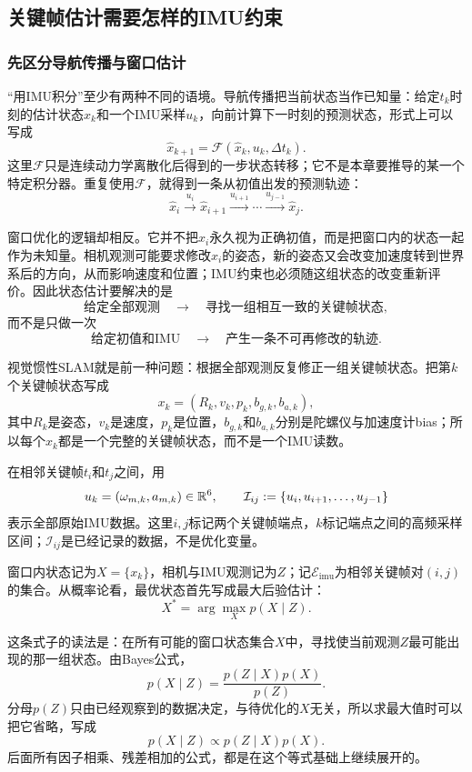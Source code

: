 \subsection{关键帧估计需要怎样的IMU约束}

\subsubsection{先区分导航传播与窗口估计}

“用IMU积分”至少有两种不同的语境。导航传播把当前状态当作已知量：给定$t_k$时刻的估计状态$\widehat{x}_k$和一个IMU采样$u_k$，向前计算下一时刻的预测状态，形式上可以写成
\[
    \widehat{x}_{k+1}
    =\mathcal F(\widehat{x}_k,u_k,\Delta t_k).
\]
这里$\mathcal F$只是连续动力学离散化后得到的一步状态转移；它不是本章要推导的某一个特定积分器。重复使用$\mathcal F$，就得到一条从初值出发的预测轨迹：
\[
    \widehat{x}_i
    \xrightarrow{u_i}
    \widehat{x}_{i+1}
    \xrightarrow{u_{i+1}}
    \cdots
    \xrightarrow{u_{j-1}}
    \widehat{x}_j.
\]

窗口优化的逻辑却相反。它并不把$\widehat{x}_i$永久视为正确初值，而是把窗口内的状态一起作为未知量。相机观测可能要求修改$x_i$的姿态，新的姿态又会改变加速度转到世界系后的方向，从而影响速度和位置；IMU约束也必须随这组状态的改变重新评价。因此状态估计要解决的是
\[
    \text{给定全部观测}
    \quad\longrightarrow\quad
    \text{寻找一组相互一致的关键帧状态},
\]
而不是只做一次
\[
    \text{给定初值和IMU}
    \quad\longrightarrow\quad
    \text{产生一条不可再修改的轨迹}.
\]

视觉惯性SLAM就是前一种问题：根据全部观测反复修正一组关键帧状态。把第$k$个关键帧状态写成
\[
    x_k=(R_k,v_k,p_k,b_{g,k},b_{a,k}),
\]
其中$R_k$是姿态，$v_k$是速度，$p_k$是位置，$b_{g,k}$和$b_{a,k}$分别是陀螺仪与加速度计bias；所以每个$x_k$都是一个完整的关键帧状态，而不是一个IMU读数。

在相邻关键帧$t_i$和$t_j$之间，用
\[
    u_k=(\omega_{m,k},a_{m,k})\in\mathbb{R}^6,
    \qquad
    \mathcal I_{ij}:=\{u_i,u_{i+1},\ldots,u_{j-1}\}
\]
表示全部原始IMU数据。这里$i,j$标记两个关键帧端点，$k$标记端点之间的高频采样区间；$\mathcal I_{ij}$是已经记录的数据，不是优化变量。

窗口内状态记为$X=\{x_k\}$，相机与IMU观测记为$Z$；记$\mathcal E_{\mathrm{imu}}$为相邻关键帧对$(i,j)$的集合。从概率论看，最优状态首先写成最大后验估计：
\[
    X^*=\arg\max_X p(X\mid Z).
\]

这条式子的读法是：在所有可能的窗口状态集合$X$中，寻找使当前观测$Z$最可能出现的那一组状态。由Bayes公式，
\[
    p(X\mid Z)=\frac{p(Z\mid X)p(X)}{p(Z)}.
\]
分母$p(Z)$只由已经观察到的数据决定，与待优化的$X$无关，所以求最大值时可以把它省略，写成
\[
    p(X\mid Z)\propto p(Z\mid X)p(X).
\]
后面所有因子相乘、残差相加的公式，都是在这个等式基础上继续展开的。

